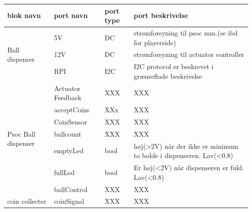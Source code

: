 \documentclass[Arkitektur/System_main.tex]{subfiles}
\begin{document}
\begin{table}[]
\begin{tabular}{|l|l|l|l|}
\hline
blok navn                            & port navn         & port type & port beskrivelse                                                                          \\ \hline
\multirow{3}{*}{Ball dispenser}      & 5V                & DC        & strømforsyning til psoc mm.(se ibd for playerside)                                        \\ \cline{2-4} 
                                     & 12V               & DC        & strømforsyning til actuator controller                                                    \\ \cline{2-4} 
                                     & RPI               & I2C       & I2C protocol er beskrevet i grænseflade beskrivelse                                       \\ \hline
\multirow{7}{*}{Psoc Ball dispenser} & Actuator Feedback & XXX       & XXX                                                                                       \\ \cline{2-4} 
                                     & acceptCoins       & XXx       & XXX                                                                                       \\ \cline{2-4} 
                                     & CoinSensor        & XXX       & XXX                                                                                       \\ \cline{2-4} 
                                     & ballcount         & XXX       & XXX                                                                                       \\ \cline{2-4} 
                                     & emptyLed          & bool      & høj(\textgreater{}2V) når der ikke er minimum to bolde i dispenseren. Lav(\textless{}0.8) \\ \cline{2-4} 
                                     & fullLed           & bool      & Er høj(\textless{}2V) når dispenseren er fuld. Lav(\textless{}0.8)                        \\ \cline{2-4} 
                                     & ballControl       & XXX       & XXX                                                                                       \\ \hline
coin collecter                       & coinSignal        & XXX       & XXX                                                                                       \\ \hline

\end{tabular}
\end{table}
\end{document}
